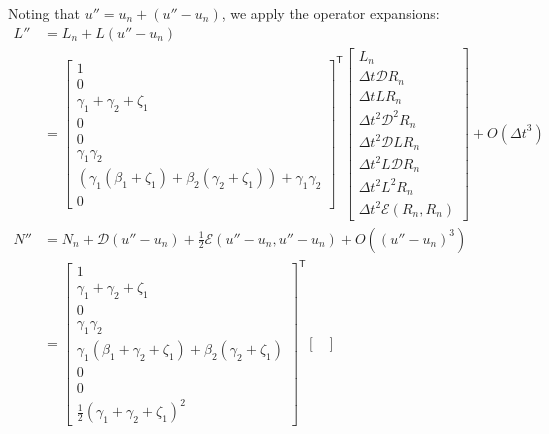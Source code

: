 \documentclass[letterpaper,11pt]{amsart}
\newcommand{\trans}[1]{{#1}^{\ensuremath{\mathsf{T}}}}
\newcommand{\order}[2]{\ensuremath{O\!\left( {#1}^{#2} \right)}}
\begin{document}
Noting that $u'' = u_{n} + \left( u'' - u_{n} \right)$,
we apply the operator expansions:
\begin{subequations}
\begin{align}
  L''
  &=
  L_{n}
  +
  L(u''-u_{n})
\\
&=
\trans{\begin{bmatrix}
  1 \\
  0 \\
  \gamma_{1} + \gamma_{2} + \zeta_{1} \\
  0 \\
  0 \\
  \gamma_{1} \gamma_{2} \\
    \left(
       \gamma_{1} \left(\beta_{1}+\zeta_{1}\right)
      +\beta_{2} \left(\gamma_{2}+\zeta_{1}\right)
    \right)
  + \gamma_{1} \gamma_{2} \\
  0
\end{bmatrix}}
\begin{bmatrix}
  L_{n} \\
  \Delta{}t \mathcal{D} R_{n} \\
  \Delta{}t L R_{n} \\
  \Delta{}t^{2} \mathcal{D}^{2} R_{n} \\
  \Delta{}t^{2} \mathcal{D} L R_{n} \\
  \Delta{}t^{2} L \mathcal{D} R_{n} \\
  \Delta{}t^{2} L^{2} R_{n} \\
  \Delta{}t^{2} \mathcal{E}\left( R_{n}, R_{n} \right)
\end{bmatrix}
  + \order{\Delta{}t}{3}
\\
  N''
  &=
  N_{n}
  + \mathcal{D} \left( u'' - u_{n} \right)
  + \frac{1}{2} \mathcal{E} \left( u''-u_{n}, u''-u_{n} \right)
  + \order{\left(u''-u_{n}\right)}{3}
\\
  &=
\trans{\begin{bmatrix}
  1 \\
  \gamma_{1} + \gamma_{2} + \zeta_{1} \\
  0 \\
  \gamma_{1} \gamma_{2} \\
    \gamma_{1} \left(\beta_{1} + \gamma_{2} + \zeta_{1}\right)
  + \beta_{2} \left(\gamma_{2} + \zeta_{1}\right) \\
  0 \\
  0 \\
  \frac{1}{2} \left( \gamma_{1} + \gamma_{2} + \zeta_{1} \right)^{2}
\end{bmatrix}}
\begin{bmatrix}

\end{bmatrix}
\end{align}
\end{subequations}
\end{document}

